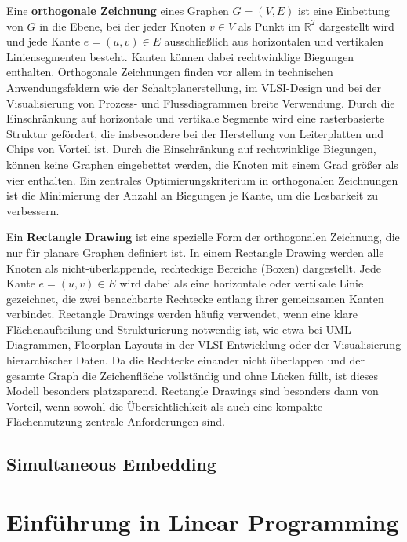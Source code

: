 \documentclass[bachelor, german]{algothesis}
\begin{document}
Eine \textbf{orthogonale Zeichnung} eines Graphen $G = (V,E)$ ist eine Einbettung von $G$ in die Ebene, bei der jeder Knoten $v \in V$ als Punkt im $\mathbb{R}^2$ dargestellt wird und jede Kante $e = (u,v) \in E$ ausschließlich aus horizontalen und vertikalen Liniensegmenten besteht. Kanten können dabei rechtwinklige Biegungen enthalten.\newline
Orthogonale Zeichnungen finden vor allem in technischen Anwendungsfeldern wie der Schaltplanerstellung, im VLSI-Design und bei der Visualisierung von Prozess- und Flussdiagrammen breite Verwendung. Durch die Einschränkung auf horizontale und vertikale Segmente wird eine rasterbasierte Struktur gefördert, die insbesondere bei der Herstellung von Leiterplatten und Chips von Vorteil ist.\newline
Durch die Einschränkung auf rechtwinklige Biegungen, können keine Graphen eingebettet werden, die Knoten mit einem Grad größer als vier enthalten. Ein zentrales Optimierungskriterium in orthogonalen Zeichnungen ist die Minimierung der Anzahl an Biegungen je Kante, um die Lesbarkeit zu verbessern.\newline

Ein \textbf{Rectangle Drawing} ist eine spezielle Form der orthogonalen Zeichnung, die nur für planare Graphen definiert ist. In einem Rectangle Drawing werden alle Knoten als nicht-überlappende, rechteckige Bereiche (Boxen) dargestellt. Jede Kante $e = (u,v) \in E$ wird dabei als eine horizontale oder vertikale Linie gezeichnet, die zwei benachbarte Rechtecke entlang ihrer gemeinsamen Kanten verbindet.\newline
Rectangle Drawings werden häufig verwendet, wenn eine klare Flächenaufteilung und Strukturierung notwendig ist, wie etwa bei UML-Diagrammen, Floorplan-Layouts in der VLSI-Entwicklung oder der Visualisierung hierarchischer Daten. Da die Rechtecke einander nicht überlappen und der gesamte Graph die Zeichenfläche vollständig und ohne Lücken füllt, ist dieses Modell besonders platzsparend.\newline
Rectangle Drawings sind besonders dann von Vorteil, wenn sowohl die Übersichtlichkeit als auch eine kompakte Flächennutzung zentrale Anforderungen sind.


\subsection{Simultaneous Embedding}


\section{Einführung in Linear Programming}
\end{document}
